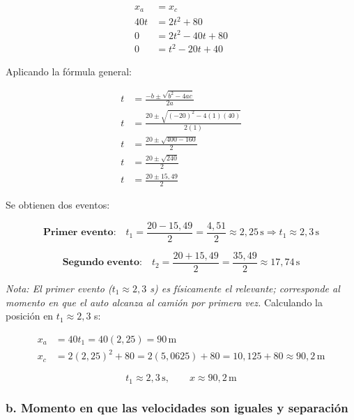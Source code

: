 \begin{align*}
x_a &= x_c \\
40t &= 2t^2 + 80 \\
0 &= 2t^2 - 40t + 80 \\
0 &= t^2 - 20t + 40
\end{align*}

Aplicando la fórmula general:
\vspace{-20pt}

\begin{align*}
t &= \frac{-b \pm \sqrt{b^2 - 4ac}}{2a} \\
t &= \frac{20 \pm \sqrt{(-20)^2 - 4(1)(40)}}{2(1)} \\
t &= \frac{20 \pm \sqrt{400 - 160}}{2} \\
t &= \frac{20 \pm \sqrt{240}}{2} \\
t &= \frac{20 \pm 15{,}49}{2}
\end{align*}

Se obtienen dos eventos:
\vspace{-20pt}

\[
\textbf{Primer evento:} \quad t_1 = \frac{20 - 15{,}49}{2} = \frac{4{,}51}{2} \approx 2{,}25\,\text{s} \Rightarrow t_1 \approx 2{,}3\,\text{s}
\]

\[
\textbf{Segundo evento:} \quad t_2 = \frac{20 + 15{,}49}{2} = \frac{35{,}49}{2} \approx 17{,}74\,\text{s}
\]

\textit{Nota: El primer evento ($t_1 \approx 2{,}3$ s) es físicamente el relevante; corresponde al momento en que el auto alcanza al camión por primera vez.}
Calculando la posición en $t_1 \approx 2{,}3$ s:
\vspace{-20pt}

\begin{align*}
x_a &= 40t_1 = 40(2{,}25) = 90\,\text{m} \\
x_c &= 2(2{,}25)^2 + 80 = 2(5{,}0625) + 80 = 10{,}125 + 80 \approx 90{,}2\,\text{m}
\end{align*}
\vspace{-20pt}

\[
\boxed{t_1 \approx 2{,}3\,\text{s}, \qquad x \approx 90{,}2\,\text{m}}
\]

\subsubsection*{b. Momento en que las velocidades son iguales y separación}

\vspace{-40pt}

